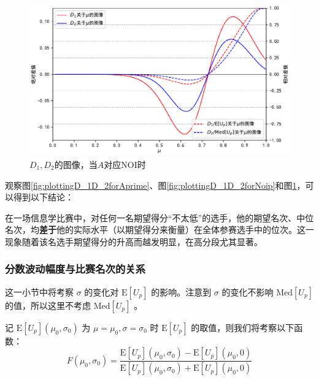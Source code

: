             \begin{figure}[p]
                \centering
                \includegraphics[width=\textwidth]{fig/plottingNoiD_1D_2.pdf}
                \caption{$D_1,D_2$的图像，当$A$对应NOI时}
                \label{fig:plottingD_1D_2forNoi}
            \end{figure}

            \vspace{1.5ex}

            观察图\ref{fig:plottingD_1D_2forAprime}、图\ref{fig:plottingD_1D_2forNoip}和图\ref{fig:plottingD_1D_2forNoi}，可以得到以下结论：

            \begin{tcolorbox}[colback=white,colframe=black,boxrule=0.5pt,arc=0pt]
                在一场信息学比赛中，对任何一名期望得分“不太低”的选手，他的期望名次、中位名次，均\textbf{差于}他的实际水平（以期望得分来衡量）在全体参赛选手中的位次。这一现象随着该名选手期望得分的升高而越发明显，在高分段尤其显著。
            \end{tcolorbox}

        \subsubsection{分数波动幅度与比赛名次的关系}

            这一小节中将考察 $\sigma$ 的变化对 $\mathrm{E}\left[U_p\right]$ 的影响。注意到 $\sigma$ 的变化不影响 $\mathrm{Med}\left[U_p\right]$ 的值，所以这里不考虑 $\mathrm{Med}\left[U_p\right]$ 。

            记 $\mathrm{E}\left[U_p\right](\mu_0,\sigma_0)$ 为 $\mu=\mu_0,\sigma=\sigma_0$ 时 $\mathrm{E}\left[U_p\right]$ 的取值，则我们将考察以下函数：
            $$
            F(\mu_0,\sigma_0)=\frac{\mathrm{E}\left[U_p\right](\mu_0,\sigma_0)-\mathrm{E}\left[U_p\right](\mu_0,0)}{\mathrm{E}\left[U_p\right](\mu_0,\sigma_0)+\mathrm{E}\left[U_p\right](\mu_0,0)}
            $$

